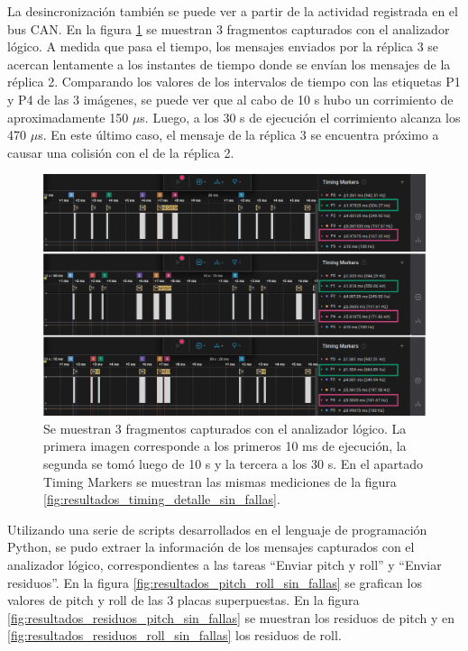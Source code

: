 La desincronización también se puede ver a partir de la actividad registrada en el bus CAN. En la figura \ref{fig:resultados_timing_detalle_placa_3_no_sync} se muestran 3 fragmentos capturados con el analizador lógico. A medida que pasa el tiempo, los mensajes enviados por la réplica 3 se acercan lentamente a los instantes de tiempo donde se envían los mensajes de la réplica 2. Comparando los valores de los intervalos de tiempo con las etiquetas P1 y P4 de las 3 imágenes, se puede ver que al cabo de 10 s hubo un corrimiento de aproximadamente 150 $\mu$s. Luego, a los 30 s de ejecución el corrimiento alcanza los 470 $\mu$s. En este último caso, el mensaje de la réplica 3 se encuentra próximo a causar una colisión con el de la réplica 2.

\begin{figure}[!t]
    \centering
    \includegraphics[width=\textwidth]{img/resultados_timing_detalle_placa_3_no_sync.png}
    \caption{Se muestran 3 fragmentos capturados con el analizador lógico. La primera imagen corresponde a los primeros 10 ms de ejecución, la segunda se tomó luego de 10 s y la tercera a los 30 s. En el apartado Timing Markers se muestran las mismas mediciones de la figura \ref{fig:resultados_timing_detalle_sin_fallas}.}
    \label{fig:resultados_timing_detalle_placa_3_no_sync}
\end{figure}

Utilizando una serie de scripts desarrollados en el lenguaje de programación Python, se pudo extraer la información de los mensajes capturados con el analizador lógico, correspondientes a las tareas ``Enviar pitch y roll'' y ``Enviar residuos''. En la figura \ref{fig:resultados_pitch_roll_sin_fallas} se grafican los valores de pitch y roll de las 3 placas superpuestas. En la figura \ref{fig:resultados_residuos_pitch_sin_fallas} se muestran los residuos de pitch y en \ref{fig:resultados_residuos_roll_sin_fallas} los residuos de roll.

